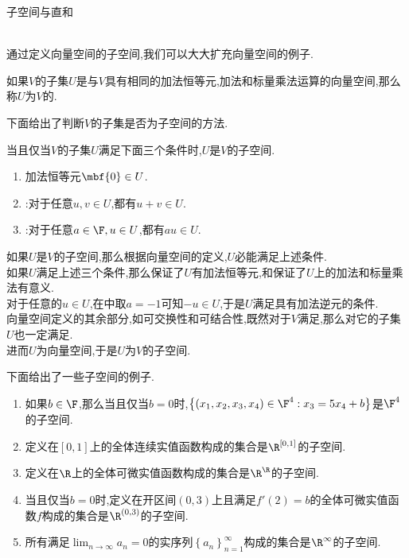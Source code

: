 \documentclass{ctexart}
\begin{document}
\pagestyle{empty}
\begin{center}\large 子空间与直和\end{center}
\\
通过定义向量空间的子空间,我们可以大大扩充向量空间的例子.
\begin{definition}[1.1 定义:子空间]
    如果$V$的子集$U$是与$V$具有相同的加法恒等元,加法和标量乘法运算的向量空间,那么称$U$为$V$的.
\end{definition}\noindent
下面给出了判断$V$的子集是否为子空间的方法.
\begin{formal}[1.2 判断子空间的方法]
    当且仅当$V$的子集$U$满足下面三个条件时,$U$是$V$的子空间.
    \begin{enumerate}[label=\textbf{(\arabic*)}]
        \item 加法恒等元$\mbf{0}\in U$.
        \item {}:对于任意$u,v\in U$,都有$u+v\in U$.
        \item {}:对于任意$a\in\F,u\in U$,都有$au\in U$.
    \end{enumerate}
\end{formal}
\begin{solution}[1.2 Proof.]
    如果$U$是$V$的子空间,那么根据向量空间的定义,$U$必能满足上述条件.\\
    如果$U$满足上述三个条件,那么保证了$U$有加法恒等元,和保证了$U$上的加法和标量乘法有意义.\\
    对于任意的$u\in U$,在中取$a=-1$可知$-u\in U$,于是$U$满足具有加法逆元的条件.\\
    向量空间定义的其余部分,如可交换性和可结合性,既然对于$V$满足,那么对它的子集$U$也一定满足.\\
    进而$U$为向量空间,于是$U$为$V$的子空间.
\end{solution}\noindent
下面给出了一些子空间的例子.
\begin{problem}[1.3.1 例:子空间]
    \begin{enumerate}[label=\textbf{(\alph*)}]
        \item 如果$b\in\F$,那么当且仅当$b=0$时,$\left\{(x_1,x_2,x_3,x_4)\in\F^4:x_3=5x_4+b\right\}$是$\F^4$的子空间.
        \item 定义在$[0,1]$上的全体连续实值函数构成的集合是$\R^{[0,1]}$的子空间.
        \item 定义在$\R$上的全体可微实值函数构成的集合是$\R^{\R}$的子空间.
        \item 当且仅当$b=0$时,定义在开区间$(0,3)$上且满足$f'(2)=b$的全体可微实值函数$f$构成的集合是$\R^{(0,3)}$的子空间.
        \item 所有满足$\displaystyle\lim_{n\to\infty}a_n=0$的实序列$\left\{a_n\right\}_{n=1}^{\infty}$构成的集合是$\R^{\infty}$的子空间.
    \end{enumerate}
\end{problem}\noindent
\end{document}
